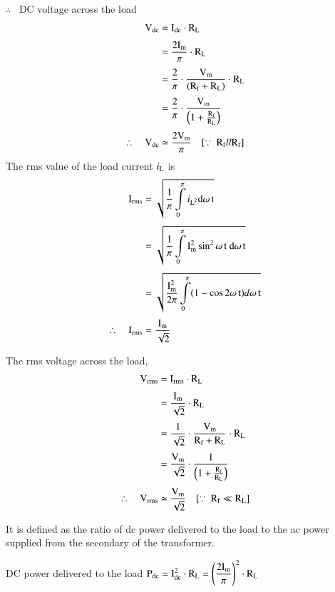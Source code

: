 \eject

\noindent
$\therefore$~ DC voltage across the load
\begin{align}
\textrm{V}_{\text{dc}} &= \textrm{I}_{\text{dc}}\cdot \textrm{R}_{\textrm{L}}\notag\\[3pt]
&= \frac{2\textrm{I}_{\textrm{m}}}{\pi}\cdot \textrm{R}_{\textrm{L}}\notag\\[3pt]
&= \frac{2}{\pi}\cdot \frac{\textrm{V}_{\textrm{m}}}{(\textrm{R}_{\textrm{f}}+\textrm{R}_{\textrm{L}})}\cdot \textrm{R}_{\textrm{L}}\notag\\[3pt]
&= \frac{2}{\pi}\cdot \frac{\textrm{V}_{\textrm{m}}}{\left(1+\frac{\textrm{R}_{\textrm{f}}}{\textrm{R}_{\textrm{L}}}\right)}\notag\\[3pt]
\therefore\quad \textrm{V}_{\text{dc}} &\simeq \frac{2\textrm{V}_{\textrm{m}}}{\pi}\quad [\because \ \textrm{R}_{\textrm{f}}ll \textrm{R}_{\textrm{f}}]\label{eq1.17}
\end{align}
The rms value of the load current $i_{\textrm{L}}$ is
\begin{align}
\textrm{I}_{\text{rms}} &= \sqrt{\frac{1}{\pi}\int\limits^{\pi}_{0}i_{\textrm{L}^{2}}\textrm{d} \omega\, \textrm{t}}\notag\\[3pt]
&= \sqrt{\frac{1}{\pi}\int\limits^{\pi}_{0}\textrm{I}^{2}_{\textrm{m}}\sin^{2}\omega\,\textrm{t} \ \textrm{d} \omega\,\textrm{t}}\notag\\[3pt]
&= \sqrt{\frac{\textrm{I}^{2}_{\textrm{m}}}{2\pi}\int\limits^{\pi}_{0}(1-\cos 2\omega\, \textrm{t})d\omega\, \textrm{t}}\notag\\[3pt]
\therefore\quad \textrm{I}_{\text{rms}} &= \frac{\textrm{I}_{\textrm{m}}}{\sqrt{2}}\label{eq1.18}
\end{align}

The rms voltage across the load,
\begin{align}
\textrm{V}_{\text{rms}} &= \textrm{I}_{\text{rms}}\cdot \textrm{R}_{\textrm{L}}\notag\\[3pt]
&= \frac{\textrm{I}_{\textrm{m}}}{\sqrt{2}}\cdot \textrm{R}_{\textrm{L}}\notag\\[3pt]
&= \frac{1}{\sqrt{2}}\cdot \frac{\textrm{V}_{\textrm{m}}}{\textrm{R}_{\textrm{f}}+\textrm{R}_{\textrm{L}}}\cdot \textrm{R}_{\textrm{L}}\notag\\[3pt]
&= \frac{\textrm{V}_{\textrm{m}}}{\sqrt{2}}\cdot \frac{1}{\left(1+\frac{\textrm{R}_{\textrm{f}}}{\textrm{R}_{\textrm{L}}}\right)}\notag\\[3pt]
\therefore\quad \textrm{V}_{\text{rms}} &\simeq \frac{\textrm{V}_{\textrm{m}}}{\sqrt{2}}\quad [\because \ \textrm{R}_{\textrm{f}}\ll \textrm{R}_{\textrm{L}}]\label{eq1.19}
\end{align}

 It is defined as the ratio of dc power delivered to the load to the ac power supplied from the secondary of the transformer.

DC power delivered to the load $\textrm{P}_{\text{dc}}=\textrm{I}^{2}_{\text{dc}}\cdot \textrm{R}_{\textrm{L}}=\left(\dfrac{2\textrm{I}_{\textrm{m}}}{\pi}\right)^{2}\cdot \textrm{R}_{\textrm{L}}$

